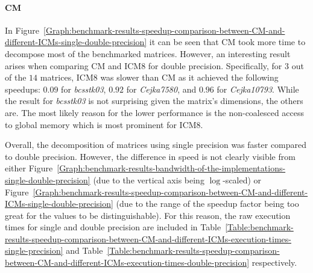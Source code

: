 \paragraph{CM}\label{Paragraph:benchmark-results-speedup-comparison-between-CM-and-different-ICMs-CM-speedup-description}
In Figure~\ref{Graph:benchmark-results-speedup-comparison-between-CM-and-different-ICMs-single-double-precision} it can be seen that CM took more time to decompose most of the benchmarked matrices. However, an interesting result arises when comparing CM and ICM8 for double precision. Specifically, for $ 3 $ out of the $ 14 $ matrices, ICM8 was slower than CM as it achieved the following speedups: $ 0.09 $ for \textit{bcsstk03}, $ 0.92 $ for \textit{Cejka7580}, and $ 0.96 $ for \textit{Cejka10793}. While the result for \textit{bcsstk03} is not surprising given the matrix's dimensions, the others are. The most likely reason for the lower performance is the non-coalesced access to global memory which is most prominent for ICM8.
\par Overall, the decomposition of matrices using single precision was faster compared to double precision. However, the difference in speed is not clearly visible from either Figure~\ref{Graph:benchmark-results-bandwidth-of-the-implementations-single-double-precision} (due to the vertical axis being $ \log $-scaled) or Figure~\ref{Graph:benchmark-results-speedup-comparison-between-CM-and-different-ICMs-single-double-precision} (due to the range of the speedup factor being too great for the values to be distinguishable). For this reason, the raw execution times for single and double precision are included in Table~\ref{Table:benchmark-results-speedup-comparison-between-CM-and-different-ICMs-execution-times-single-precision} and Table~\ref{Table:benchmark-results-speedup-comparison-between-CM-and-different-ICMs-execution-times-double-precision} respectively.

